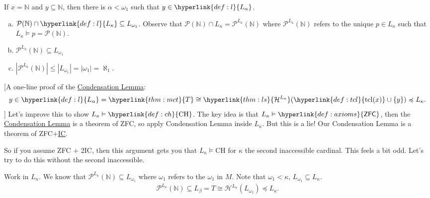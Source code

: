 \documentclass{article}
\newcommand{\1}{\mathbbm{1}}
\DeclareMathOperator{\tcl}{tcl}
\let\models\vDash
\begin{document}
\begin{cor}
  \newlec
  If $x = \mathbb{N}$ and $y \subseteq \mathbb{N}$, then there is $\alpha < \omega_1$ such that $y \in \hyperlink{def:l}{L_\alpha}$.
\end{cor}
\begin{cor}\leavevmode
  \begin{enumerate}[(a)]
    \item $\mathcal{P}(\mathbb{N}) \cap \hyperlink{def:l}{L_\kappa} \subseteq L_{\omega_1}$.
      Observe that $\mathcal{P}(\mathbb{N}) \cap L_\kappa = \mathcal{P}^{L_\kappa}(\mathbb{N})$ where $\mathcal{P}^{L_\kappa}(\mathbb{N})$ refers to the unique $p \in L_\kappa$ such that $L_\kappa \models p = \mathcal{P}(\mathbb{N})$.
    \item $\mathcal{P}^{L_\kappa}(\mathbb{N}) \subseteq L_{\omega_1}$
    \item $|\mathcal{P}^{L_\kappa}(\mathbb{N})| \leq |L_{\omega_1}| = |\omega_1| = \aleph_1.$
  \end{enumerate}
\end{cor}
[A one-line proof of the \hyperlink{lem:con}{Condensation Lemma}:
\begin{align*}
  y \in \hyperlink{def:l}{L_\alpha} = \hyperlink{thm:mct}{T} \cong \hyperlink{thm:ls}{\mathcal{H}^{L_\kappa}}(\hyperlink{def:tcl}{\tcl(x)} \cup \{y\}) \preccurlyeq L_\kappa.
\end{align*}
]
Let's improve this to show $L_\kappa \models \hyperlink{def:ch}{\text{CH}}$.
The key idea is that $L_\kappa \models \hyperlink{def:axioms}{\textsf{ZFC}}$, then the \hyperlink{lem:con}{Condensation Lemma} is a theorem of \textsf{ZFC}, so apply Condensation Lemma inside $L_\kappa$.
But this is a lie! Our Condensation Lemma is a theorem of \textsf{ZFC}+\hyperlink{def:ic}{\textsf{IC}}.
\begin{remark}
  So if you assume \textsf{ZFC} + \textsf{2IC}, then this argument gets you that $L_\kappa \models \text{CH}$ for $\kappa$ the second inaccessible cardinal.
  This feels a bit odd. Let's try to do this without the second inaccessible.
\end{remark}
Work in $L_\kappa$. We know that $\mathcal{P}^{L_\kappa}(\mathbb{N}) \subseteq L_{\omega_1}$ where $\omega_1$ refers to the $\omega_1$ in $M$.
Note that $\omega_1 < \kappa$, $L_{\omega_1} \subseteq L_\kappa$.
\begin{align*}
  \mathcal{P}^{L_\kappa}(\mathbb{N}) \subseteq L_\beta = T \cong \mathcal{H}^{L_\kappa}(L_{\omega_1}) \preccurlyeq L_\kappa.
\end{align*}
\end{document}
